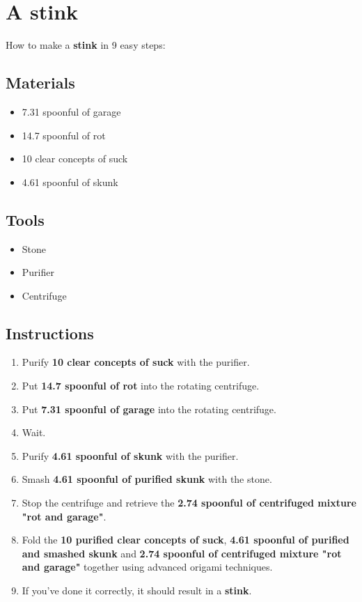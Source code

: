 \documentclass{article}
\begin{document}
\section{A stink}How to make a \textbf{stink} in 9 easy steps:

\subsection{Materials}\begin{itemize}
\item 
7.31 spoonful of garage
\item 
14.7 spoonful of rot
\item 
10 clear concepts of suck
\item 
4.61 spoonful of skunk
\end{itemize}
\subsection{Tools}\begin{itemize}
\item 
Stone
\item 
Purifier
\item 
Centrifuge
\end{itemize}
\subsection{Instructions}\begin{enumerate}
\item 
Purify \textbf{10 clear concepts of suck} with the purifier.
\item 
Put \textbf{14.7 spoonful of rot} into the rotating centrifuge.
\item 
Put \textbf{7.31 spoonful of garage} into the rotating centrifuge.
\item 
Wait.
\item 
Purify \textbf{4.61 spoonful of skunk} with the purifier.
\item 
Smash \textbf{4.61 spoonful of purified skunk} with the stone.
\item 
Stop the centrifuge and retrieve the \textbf{2.74 spoonful of centrifuged mixture "rot and garage"}.
\item 
Fold the \textbf{10 purified clear concepts of suck}, \textbf{4.61 spoonful of purified and smashed skunk} and \textbf{2.74 spoonful of centrifuged mixture "rot and garage"} together using advanced origami techniques.
\item 
If you've done it correctly, it should result in a \textbf{stink}.
\end{enumerate}
\newpage
\end{document}
